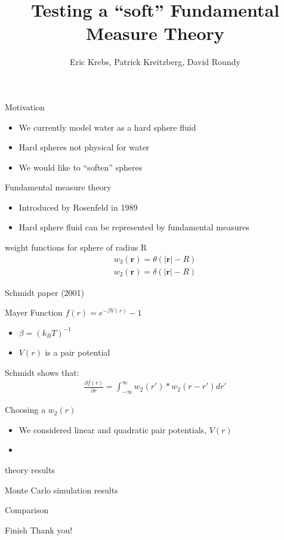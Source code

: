 \documentclass{beamer}
\title[Soft FMT]{Testing a ``soft'' Fundamental Measure Theory}
\author{Eric Krebs, Patrick Kreitzberg, David Roundy}
\institute{Oregon State University}
\date{}
\newcommand{\rr}{\textbf{r}}
\begin{document}
\begin{frame}
 \titlepage
\end{frame}

\begin{frame}{Motivation}
  \begin{itemize}
    \item We currently model water as a hard sphere fluid
    \item Hard spheres not physical for water
    \item We would like to ``soften'' spheres
  \end{itemize}
\end{frame}

\begin{frame}{Fundamental measure theory}
  \begin{itemize}
    \item Introduced by Rosenfeld in 1989
    \item Hard sphere fluid can be represented by fundamental measures
  \end{itemize}
  \begin{block}{weight functions for sphere of radius R}
    \begin{align}
      w_3(\rr) = \theta (|\rr| - R) \\
      w_2(\rr) = \delta (|\rr| - R)
    \end{align}
  \end{block}
\end{frame}

\begin{frame}{Schmidt paper (2001)}
  \begin{block}{Mayer Function}
    $f(r) = e^{-\beta V(r)} - 1$
    \begin{itemize}
      \item $\beta = (k_BT)^{-1}$
      \item $V(r)$ is a pair potential
    \end{itemize}
  \end{block}
  Schmidt shows that:
  \begin{align}
    \frac{\partial f(r)}{\partial r} = \int_{-\infty}^{\infty}w_2(r')
    \ast w_2(r - r') dr'
  \end{align}
\end{frame}

\begin{frame}{Choosing a $w_2(r)$}
  \begin{itemize}
    \item We considered linear and quadratic pair potentials, $V(r)$
    \item
  \end{itemize}
\end{frame}

\begin{frame}{theory results}
\end{frame}

\begin{frame}{Monte Carlo simulation results}
\end{frame}

\begin{frame}{Comparison}
\end{frame}

\begin{frame}{Finish}
  Thank you!
\end{frame}
\end{document}
